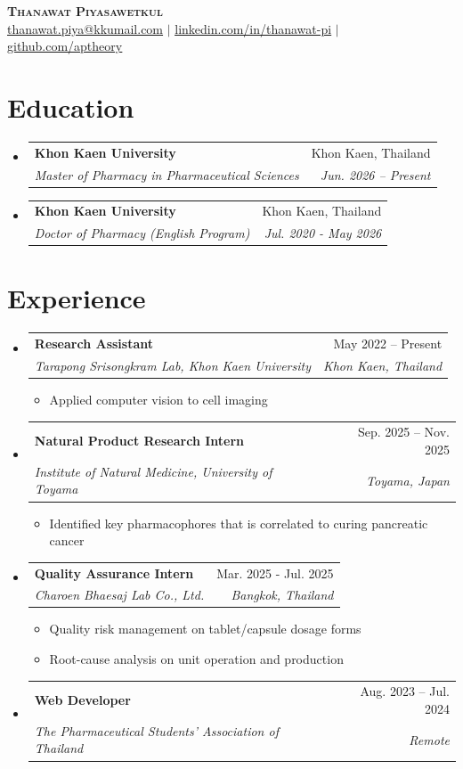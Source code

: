 \documentclass[letterpaper,11pt]{article}
\makeatletter
\newcommand{\resumeItem}[1]{
	\item\small{
		{#1 \vspace{-2pt}}
	}
}
\newcommand{\resumeSubheading}[4]{
	\vspace{-2pt}\item
	\begin{tabular*}{0.97\textwidth}[t]{l@{\extracolsep{\fill}}r}
		\textbf{#1} & #2 \\
		\textit{\small#3} & \textit{\small #4} \\
	\end{tabular*}\vspace{-7pt}
}
\newcommand{\resumeSubHeadingListStart}{\begin{itemize}[leftmargin=0.15in, label={}]}
\newcommand{\resumeSubHeadingListEnd}{\end{itemize}}
\newcommand{\resumeItemListStart}{\begin{itemize}}
\newcommand{\resumeItemListEnd}{\end{itemize}\vspace{-5pt}}
\makeatother
\begin{document}
	
	\begin{center}
		\textbf{\Huge \scshape Thanawat Piyasawetkul} \\ \vspace{1pt}
		\href{mailto:thanawat.piya@kkumail.com}{\underline{thanawat.piya@kkumail.com}} $|$ 
		\href{https://linkedin.com/in/thanawat-pi}{\underline{linkedin.com/in/thanawat-pi}} $|$
		\href{https://github.com/aptheory}{\underline{github.com/aptheory}}
	\end{center}
	
	
	\section{Education}
	\resumeSubHeadingListStart
	\resumeSubheading
	{Khon Kaen University}{Khon Kaen, Thailand}
	{Master of Pharmacy in Pharmaceutical Sciences}{Jun. 2026 -- Present}
	\resumeSubheading
	{Khon Kaen University}{Khon Kaen, Thailand}
	{Doctor of Pharmacy (English Program)}{Jul. 2020 - May 2026}
	\resumeSubHeadingListEnd
	
	
	\section{Experience}
	\resumeSubHeadingListStart
	
	\resumeSubheading
	{Research Assistant}{May 2022 -- Present}
	{Tarapong Srisongkram Lab, Khon Kaen University}{Khon Kaen, Thailand}
	\resumeItemListStart
	\resumeItem{Applied computer vision to cell imaging}
	\resumeItemListEnd
	
	\resumeSubheading
	{Natural Product Research Intern}{Sep. 2025 -- Nov. 2025}
	{Institute of Natural Medicine, University of Toyama}{Toyama, Japan}
	\resumeItemListStart
	\resumeItem{Identified key pharmacophores that is correlated to curing pancreatic cancer}
	\resumeItemListEnd
	
	\resumeSubheading
	{Quality Assurance Intern}{Mar. 2025 - Jul. 2025}
	{Charoen Bhaesaj Lab Co., Ltd.}{Bangkok, Thailand}
	\resumeItemListStart
	\resumeItem{Quality risk management on tablet/capsule dosage forms}
	\resumeItem{Root-cause analysis on unit operation and production}
	\resumeItemListEnd
	
	\resumeSubheading
	{Web Developer}{Aug. 2023 -- Jul. 2024}
	{The Pharmaceutical Students' Association of Thailand}{Remote}
	
	\resumeSubHeadingListEnd
	
\end{document}
